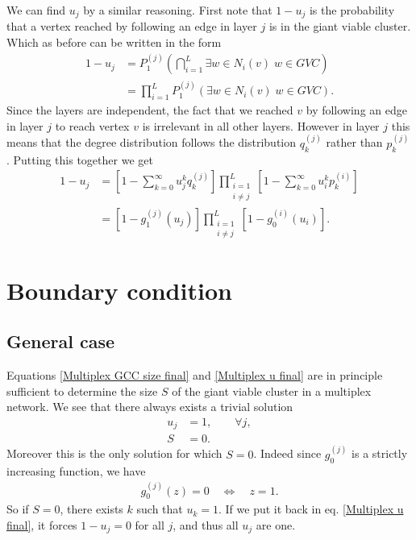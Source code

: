 \documentclass[a4paper]{article}
\begin{document}
We can find $u_j$ by a similar reasoning. First note that $1 - u_j$ is the probability that a vertex reached by following an edge in layer $j$ is in the giant viable cluster. Which as before can be written in the form
\begin{align}
	1 - u_j &= P_1^{(j)}\left(\bigcap_{i = 1}^{L} \exists w \in N_i(v) \; w \in GVC\right)\\
	&= \prod_{i = 1}^{L}  P_1^{(j)}\left(\exists w \in N_i(v) \; w \in GVC \right).
\end{align}
Since the layers are independent, the fact that we reached $v$ by following an edge in layer $j$ to reach vertex $v$ is irrelevant in all other layers. However in layer $j$ this means that the degree distribution follows the distribution $q_k^{(j)}$ rather than $p_k^{(j)}$. Putting this together we get
\begin{align}
	1 - u_j &= \left[1 - \sum_{k = 0}^{\infty} u_j^k q_k^{(j)} \right] \prod_{\substack{i = 1 \\ i \neq j}}^{L}  \left[1 - \sum_{k = 0}^{\infty} u_i^k p^{(i)}_k \right] \\
	&= \left[1 - g_1^{(j)}(u_j) \right] \prod_{\substack{i = 1 \\ i \neq j}}^{L}  \left[1 - g_0^{(i)}(u_i) \right]. \label{Multiplex u final}
\end{align}


\section{Boundary condition}

\subsection{General case}

Equations \eqref{Multiplex GCC size final} and \eqref{Multiplex u final} are in principle sufficient to determine the size $S$ of the giant viable cluster in a multiplex network. We see that there always exists a trivial solution
\begin{align}
	u_j &= 1, \qquad \forall j,\\
	S &= 0.
\end{align}
Moreover this is the only solution for which $S = 0$. Indeed since $g_0^{(j)}$ is a strictly increasing function, we have
\begin{align}
	g_0^{(j)}(z) = 0 \quad \Leftrightarrow \quad z = 1.
\end{align}
So if $S = 0$, there exists $k$ such that $u_k = 1$. If we put it back in eq. \eqref{Multiplex u final}, it forces $1 - u_j = 0$ for all $j$, and thus all $u_j$ are one.
\end{document}
